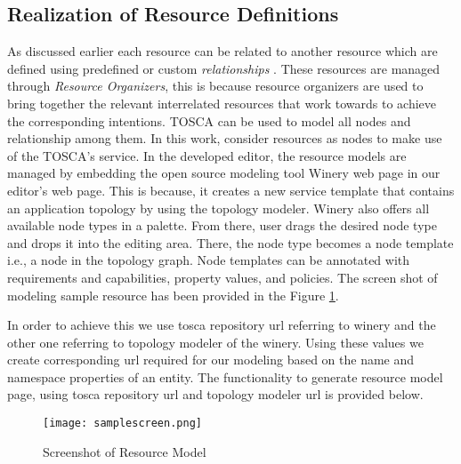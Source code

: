 \subsection{Realization of Resource Definitions}
As discussed earlier each resource can be related to another resource which are defined using predefined or custom \textit{relationships} \cite{Sungur2014a}. These resources are managed through \textit{Resource Organizers}, this is because resource organizers are used to bring together the relevant interrelated resources that work towards to achieve the corresponding intentions. TOSCA \cite{Binz2014} can be used to model all nodes and relationship among them. In this work, consider resources as nodes to make use of the TOSCA's service. In the developed editor, the resource models are managed by embedding the open source modeling tool Winery web page \cite{Kopp2013} in our editor's web page. This is because, it creates a new service template that contains an application topology by using the topology modeler. Winery also offers all available node types in a palette. From there, user drags the desired node type and drops it into the editing area. There, the node type
becomes a node template i.e., a node in the topology graph. Node templates can be annotated with requirements and capabilities, property values, and policies. The screen shot of modeling sample resource has been provided in the Figure \ref{fig:realizationofresourcemodel}. 

In order to achieve this we use tosca repository url referring to winery and the other one referring to topology modeler of the winery. Using these values we create corresponding url required for our modeling based on the name and namespace properties of an entity. The functionality to generate resource model page, using tosca repository url and topology modeler url is provided below.

			
			
\begin{figure}
	\centering
	\texttt{[image: samplescreen.png]}
	\caption{Screenshot of Resource Model}
	\label{fig:realizationofresourcemodel}
\end{figure}



